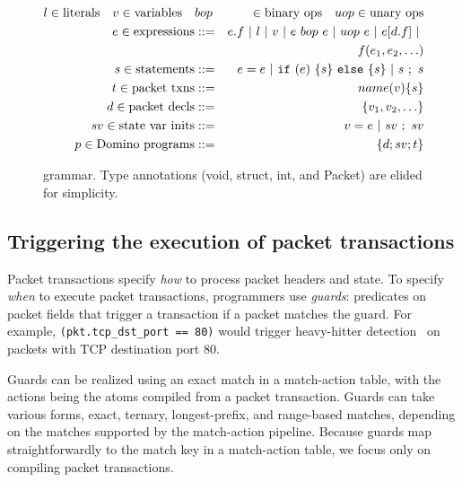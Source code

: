 \begin{figure}
\newcommand{\sep}{~|~}
\begin{small}
\begin{eqnarray*}
l \in \text{literals} \quad v \in \text{variables} \quad &bop& \in \text{binary ops} \quad
uop \in \text{unary ops} \\
%
e \in \text{expressions} &::=& e.f \sep l \sep v \sep e~bop~e \sep uop~e \sep e[d.f] \sep \\
                   & &   f(e_1, e_2, \ldots) \\
%
s \in \text{statements} &::=& e = e \sep {\tt if}~(e)~\{ s \}~{\tt else}~ \{ s \} \sep s~;~s \\
%
t \in \text{packet txns} &::=& name(v) \{ s \} \\
%
%
d \in \text{packet decls} &::=& \{ v_1, v_2, \ldots \} \\
%
sv \in \text{state var inits} &::=& v = e \sep sv~;~sv \\
%
p \in \text{\pktlanguage programs} &::=& \{ d ; sv; t \}
\end{eqnarray*}
\end{small}
\caption{\pktlanguage grammar. Type annotations (void, struct, int, and Packet) are elided for simplicity.}
\label{fig:grammar}
\end{figure}

\subsection{Triggering the execution of packet transactions}
\label{ss:guards}
Packet transactions specify \textit{how} to process packet headers and state.
To specify {\em when} to execute packet transactions, programmers use {\em
guards}: predicates on packet fields that trigger a transaction if a packet
matches the guard. For example, {\tt (pkt.tcp\_dst\_port == 80)} would trigger
heavy-hitter detection~\cite{opensketch} on packets with TCP destination port
80.

Guards can be realized using an exact match in a match-action table, with the
actions being the atoms compiled from a packet transaction. Guards can take
various forms, \eg exact, ternary, longest-prefix, and range-based matches,
depending on the matches supported by the match-action pipeline. Because guards
map straightforwardly to the match key in a match-action table, we focus only
on compiling packet transactions.

